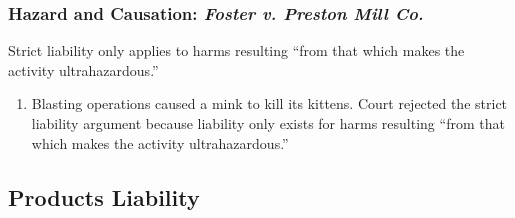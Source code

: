 \subsubsection{Hazard and Causation: \emph{Foster v. Preston Mill Co.}}

Strict liability only applies to harms resulting ``from that which makes the 
activity ultrahazardous.''

\begin{enumerate}
    \item Blasting operations caused a mink to kill its kittens. Court rejected 
    the strict liability argument because liability only exists for harms 
    resulting ``from that which makes the activity ultrahazardous.''
\end{enumerate}

\subsection{Products Liability}

